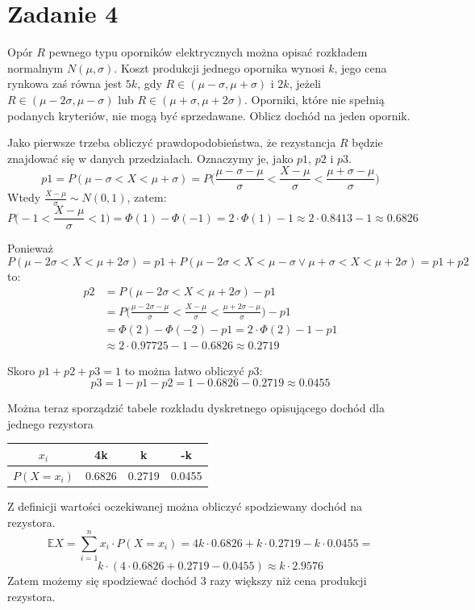 \documentclass{article}
\begin{document}
\newpage
\section{Zadanie 4}
Opór $R$ pewnego typu oporników elektrycznych można opisać rozkładem normalnym $N(\mu,\sigma)$. Koszt produkcji jednego opornika wynosi $k$, jego cena rynkowa zaś równa jest $5k$, gdy $R\in(\mu - \sigma,\mu + \sigma)$ i $2k$, jeżeli $R\in(\mu-2\sigma,\mu-\sigma)$ lub $R\in(\mu+\sigma,\mu+2\sigma)$. Oporniki, które nie spełnią podanych kryteriów, nie mogą być sprzedawane. Oblicz dochód na jeden opornik.
\\
\par
Jako pierwsze trzeba obliczyć prawdopodobieństwa, że rezystancja $R$ będzie znajdować się w danych przedziałach. Oznaczymy je, jako $p1$, $p2$ i $p3$.
$$p1 = P(\mu - \sigma< X < \mu + \sigma) = P\Big(\frac{\mu - \sigma - \mu}{\sigma} < \frac{X-\mu}{\sigma} < \frac{\mu + \sigma - \mu}{\sigma}\Big)$$
Wtedy $\frac{X-\mu}{\sigma} \sim N(0,1)$, zatem:
$$P\Big(-1<\frac{X-\mu}{\sigma}<1\Big) = \Phi(1) - \Phi(-1) = 2\cdot\Phi(1) - 1 \approx 2\cdot0.8413 - 1 \approx 0.6826$$
\par
Ponieważ 
$$P(\mu-2\sigma<X<\mu+2\sigma) = p1 + P(\mu-2\sigma<X<\mu-\sigma \vee \mu+\sigma<X<\mu+2\sigma) = p1 + p2$$
to:
\begin{align*}
p2 & = P(\mu-2\sigma<X<\mu+2\sigma) - p1 \\
& = P\Big(\frac{\mu - 2\sigma - \mu}{\sigma}<\frac{X-\mu}{\sigma}<\frac{\mu+2\sigma-\mu}{\sigma}\Big) - p1 \\
& = \Phi(2) - \Phi(-2) - p1 = 2\cdot\Phi(2) - 1 - p1 \\
& \approx 2\cdot0.97725 - 1 - 0.6826 \approx 0.2719
\end{align*}
\par
Skoro $p1 + p2 + p3 = 1$ to można łatwo obliczyć $p3$:
$$p3 = 1 - p1 - p2 = 1 - 0.6826 - 0.2719 \approx 0.0455$$

\par
Można teraz sporządzić tabele rozkładu dyskretnego opisującego dochód dla jednego rezystora
\begin{center}
\begin{tabular}{|c|c|c|c|}
\hline
$x_i$ & 4k & k & -k \\
\hline
$P(X = x_i)$ & 0.6826 & 0.2719 & 0.0455\\
\hline
\end{tabular}
\end{center}
\par
Z definicji wartości oczekiwanej można obliczyć spodziewany dochód na rezystora.
$$\mathbb{E}X = \sum_{i=1}^{n}x_i\cdot P(X=x_i) = 4k\cdot0.6826 + k\cdot0.2719 - k\cdot0.0455 =$$
$$k\cdot(4\cdot0.6826 + 0.2719 - 0.0455) \approx k\cdot 2.9576$$
Zatem możemy się spodziewać dochód 3 razy większy niż cena produkcji rezystora.
\end{document}
